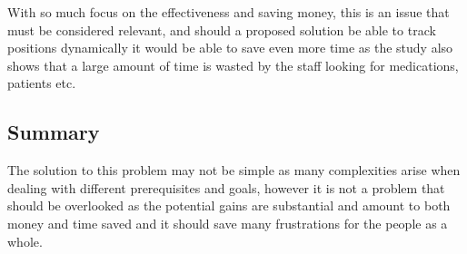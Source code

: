 With so much focus on the effectiveness and saving money, this is an issue that must be considered relevant, and should a proposed solution be able to track positions dynamically it would be able to save even more time as the study also shows that a large amount of time is wasted by the staff looking for medications, patients etc.

\subsection{Summary}
The solution to this problem may not be simple as many complexities arise when dealing with different prerequisites and goals, however it is not a problem that should be overlooked as the potential gains are substantial and amount to both money and time saved and it should save many frustrations for the people as a whole.